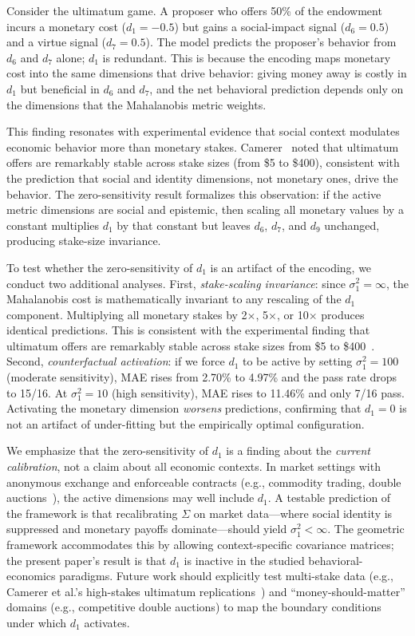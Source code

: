 \documentclass[journal]{IEEEtran}
\begin{document}
Consider the ultimatum game.
A proposer who offers 50\% of the endowment incurs a monetary cost ($d_1 = -0.5$) but gains a social-impact signal ($d_6 = 0.5$) and a virtue signal ($d_7 = 0.5$).
The model predicts the proposer's behavior from $d_6$ and $d_7$ alone; $d_1$ is redundant.
This is because the encoding maps monetary cost into the same dimensions that drive behavior: giving money away is costly in $d_1$ but beneficial in $d_6$ and $d_7$, and the net behavioral prediction depends only on the dimensions that the Mahalanobis metric weights.

This finding resonates with experimental evidence that social context modulates economic behavior more than monetary stakes.
Camerer~\cite{camerer2003} noted that ultimatum offers are remarkably stable across stake sizes (from \$5 to \$400), consistent with the prediction that social and identity dimensions, not monetary ones, drive the behavior.
The zero-sensitivity result formalizes this observation: if the active metric dimensions are social and epistemic, then scaling all monetary values by a constant multiplies $d_1$ by that constant but leaves $d_6$, $d_7$, and $d_9$ unchanged, producing stake-size invariance.

To test whether the zero-sensitivity of $d_1$ is an artifact of the encoding, we conduct two additional analyses.
First, \emph{stake-scaling invariance}: since $\sigma_1^2 = \infty$, the Mahalanobis cost is mathematically invariant to any rescaling of the $d_1$ component.
Multiplying all monetary stakes by 2$\times$, 5$\times$, or 10$\times$ produces identical predictions.
This is consistent with the experimental finding that ultimatum offers are remarkably stable across stake sizes from \$5 to \$400~\cite{camerer2003}.
Second, \emph{counterfactual activation}: if we force $d_1$ to be active by setting $\sigma_1^2 = 100$ (moderate sensitivity), MAE rises from 2.70\% to 4.97\% and the pass rate drops to 15/16.
At $\sigma_1^2 = 10$ (high sensitivity), MAE rises to 11.46\% and only 7/16 pass.
Activating the monetary dimension \emph{worsens} predictions, confirming that $d_1 = 0$ is not an artifact of under-fitting but the empirically optimal configuration.

We emphasize that the zero-sensitivity of $d_1$ is a finding about the \emph{current calibration}, not a claim about all economic contexts.
In market settings with anonymous exchange and enforceable contracts (e.g., commodity trading, double auctions~\cite{smith1962}), the active dimensions may well include $d_1$.
A testable prediction of the framework is that recalibrating $\Sigma$ on market data---where social identity is suppressed and monetary payoffs dominate---should yield $\sigma_1^2 < \infty$.
The geometric framework accommodates this by allowing context-specific covariance matrices; the present paper's result is that $d_1$ is inactive in the studied behavioral-economics paradigms.
Future work should explicitly test multi-stake data (e.g., Camerer et al.'s high-stakes ultimatum replications~\cite{camerer2003}) and ``money-should-matter'' domains (e.g., competitive double auctions) to map the boundary conditions under which $d_1$ activates.
\end{document}
